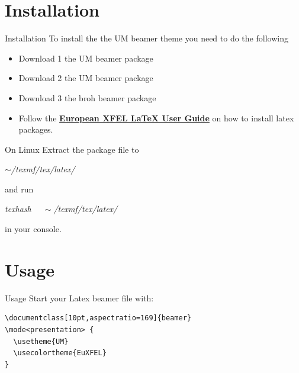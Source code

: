 \documentclass[10pt, aspectratio=169]{beamer}
\newcommand{\colorbf}[1]{{\color{umGreen}\textbf{#1}}}
\begin{document}
\section{Installation}
{
    \begin{frame}
        \sectionpage%
    \end{frame}
}
\begin{frame}{Installation}
    To install the the UM beamer theme you need to do the following
    \begin{itemize}
        \item Download 1 the UM beamer package
        \item Download 2 the UM beamer package
        \item Download 3 the broh beamer package
        \item Follow the \href{https://docs.xfel.eu/share/proxy/alfresco/api/node/content/workspace/SpacesStore/92e260f4-e0a7-4463-a812-40a180bd6e75/IN-2012-003-01_LaTeX_User_Guide.pdf?a=true}{\colorbf{European XFEL LaTeX User Guide}} on how to install latex packages.
    \end{itemize}
    \begin{block}{On Linux}
        Extract the package file to\\
        \centerline{\textit{$\sim$/texmf/tex/latex/}}
        and run
        \centerline{ \textit{texhash   $\quad\sim$/texmf/tex/latex/ }}
        in your console.
    \end{block}
\end{frame}

\section{Usage}
\begin{frame}[fragile]{Usage}
    Start your Latex beamer file with:
    \begin{block}{}
\begin{verbatim}
\documentclass[10pt,aspectratio=169]{beamer}
\mode<presentation> {
  \usetheme{UM}
  \usecolortheme{EuXFEL}
}
\end{verbatim}
    \end{block}
\end{frame}
\end{document}
